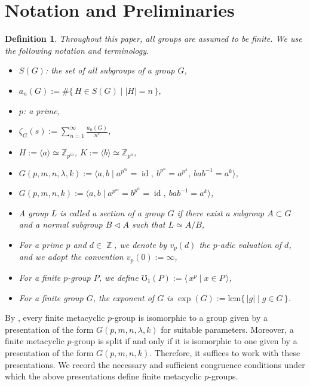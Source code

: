 \documentclass[onecolumn]{article}
\numberwithin{equation}{section}
\theoremstyle{mytheoremstyle}
\newtheorem{defi}[thm]{Definition}
\DeclareMathOperator{\Z}{\mathbb{Z}}
\DeclareMathOperator{\id}{\mathrm{id}}
\begin{document}
\section{Notation and Preliminaries}\label{section:meta-Notation and Preliminary-start}

\begin{defi}
Throughout this paper, all groups are assumed to be finite.
We use the following notation and terminology.
\begin{itemize}
  \item $S(G)$: the set of all subgroups of a group $G$,
  \item $a_{n}(G) := \#\{\,H\in S(G)\mid |H|=n\,\}$,
  \item $p$: a prime,
  \item $\zeta_{G}(s) := \sum_{n=1}^{\infty} \frac{a_{n}(G)}{n^{s}}$,
  \item $H := \langle a \rangle \simeq \mathbb{Z}_{p^{m}}$,
        $K := \langle b\rangle \simeq \mathbb{Z}_{p^{n}}$,
  \item $G(p,m,n,\lambda,k) :=
  \langle a,b \mid
    a^{p^{m}}=\id,\ 
    b^{p^{n}}=a^{p^{\lambda}},\ 
    bab^{-1} = a^{k}
  \rangle$,
  \item $G(p,m,n,k)
  :=\langle a,b \mid a^{p^{m}}=b^{p^{n}}=\id,\ bab^{-1}=a^{k}\rangle$,
  \item A group $L$ is called a \emph{section} of a group $G$ if there exist
        a subgroup $A\subset G$ and a normal subgroup $B\lhd A$ such that
        $L\simeq A/B$,
  \item For a prime $p$ and $d\in \Z$, we denote by $v_p(d)$ the $p$-adic valuation of $d$, and we adopt the convention $v_p(0):=\infty$,
  \item For a finite $p$-group $P$, we define $\mho_{1}(P):=\langle\,x^{p} \mid x\in P\,\rangle$,
  \item For a finite group $G$, the \emph{exponent} of $G$ is
$\exp(G):=\mathrm{lcm}\{\,|g|\mid g\in G\,\}$.
\end{itemize}
\end{defi}

By \cite{Hempel2000}, every finite metacyclic $p$-group is isomorphic to a group
given by a presentation of the form $G(p,m,n,\lambda,k)$ for suitable parameters.
Moreover, a finite metacyclic $p$-group is split if and only if it is isomorphic
to one given by a presentation of the form $G(p,m,n,k)$.
Therefore, it suffices to work with these presentations.
We record the necessary and sufficient congruence conditions under which the above presentations
define finite metacyclic $p$-groups.
\end{document}
